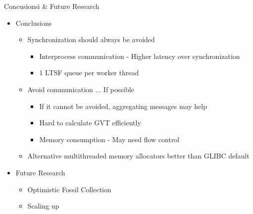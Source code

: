 \documentclass[10pt]{beamer}
\begin{document}
\begin{frame}{Concusionsi \& Future Research}
    \begin{itemize}
        \item Conclusions
            \begin{itemize}
                \item Synchronization should always be avoided
                    \begin{itemize}
                        \item Interprocess communication - Higher latency over synchronization
                        \item 1 LTSF queue per worker thread
                    \end{itemize}
                \smallskip

                \item Avoid communication ... If possible
                    \begin{itemize}
                        \item If it cannot be avoided, aggregating messages may help
                        \item Hard to calculate GVT efficiently
                        \item Memory consumption - May need flow control
                    \end{itemize}
                \smallskip

                \item Alternative multithreaded memory allocators better than GLIBC default
            \end{itemize}
        \bigskip

        \item Future Research
            \begin{itemize}
                \item Optimistic Fossil Collection
                \item Scaling up
            \end{itemize}
    \end{itemize}
\end{frame}
\end{document}
